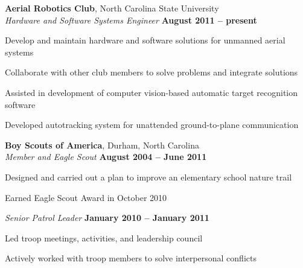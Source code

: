 \documentclass[margin,line,letterpaper]{resume}
\begin{document}
\begin{resume}
    \textbf{Aerial Robotics Club}, North Carolina State University \vspace{2mm}\\\vspace{1mm}%
    \textsl{Hardware and Software Systems Engineer} \hfill \textbf{August 2011 -- present}\vspace{-3mm}\\\vspace{-1mm}%
    \begin{list2}
    \item Develop and maintain hardware and software solutions for unmanned aerial systems
    \item Collaborate with other club members to solve problems and integrate solutions
    \item Assisted in development of computer vision-based automatic target recognition software
    \item Developed autotracking system for unattended ground-to-plane communication
    \end{list2}\vspace{-1.5mm}

    \textbf{Boy Scouts of America}, Durham, North Carolina \vspace{2mm}\\\vspace{1mm}%
    \textsl{Member and Eagle Scout} \hfill \textbf{August 2004 -- June 2011}\vspace{-3mm}\\\vspace{-1mm}%
    \begin{list2}
    \item Designed and carried out a plan to improve an elementary school nature trail
    \item Earned Eagle Scout Award in October 2010
    \end{list2}\vspace{-1.5mm}

    \textsl{Senior Patrol Leader} \hfill \textbf{January 2010 -- January 2011}\vspace{-3mm}\\\vspace{-1mm}%
    \begin{list2}
    \item Led troop meetings, activities, and leadership council
    \item Actively worked with troop members to solve interpersonal conflicts
    \end{list2}\vspace{-1.5mm}



\end{resume}
\end{document}
